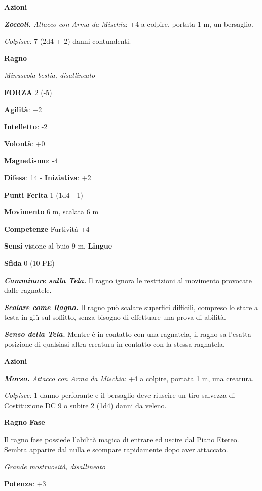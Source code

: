 \begin{multicols}{2}
\smallskip\textbf{Azioni}

\emph{\textbf{Zoccoli.} Attacco con Arma da Mischia}: +4 a colpire,
portata 1 m, un bersaglio.

\emph{Colpisce:} 7 (2d4 + 2) danni contundenti.

\textbf{Ragno}

\emph{Minuscola bestia, disallineato}

\textbf{FORZA} 2 (-5)

\textbf{Agilità}: +2

\textbf{Intelletto}: -2

\textbf{Volontà}: +0

\textbf{Magnetismo}: -4

\textbf{Difesa}: 14 - \textbf{Iniziativa}: +2

\textbf{Punti Ferita} 1 (1d4 - 1)

\textbf{Movimento} 6 m, scalata 6 m

\textbf{Competenze} Furtività +4

\textbf{Sensi} visione al buio 9 m, 
\textbf{Lingue} -

\textbf{Sfida} 0 (10 PE)\smallskip

\emph{\textbf{Camminare sulla Tela.}} Il ragno ignora le restrizioni al
movimento provocate dalle ragnatele.

\emph{\textbf{Scalare come Ragno.}} Il ragno può scalare superfici
difficili, compreso lo stare a testa in giù sul soffitto, senza bisogno
di effettuare una prova di abilità.

\emph{\textbf{Senso della Tela.}} Mentre è in contatto con una
ragnatela, il ragno sa l'esatta posizione di qualsiasi altra creatura in
contatto con la stessa ragnatela.

\smallskip\textbf{Azioni}

\emph{\textbf{Morso.} Attacco con Arma da Mischia}: +4 a colpire,
portata 1 m, una creatura.

\emph{Colpisce:} 1 danno perforante e il bersaglio deve riuscire un tiro
salvezza di Costituzione DC 9 o subire 2 (1d4) danni da veleno.



\textbf{Ragno Fase}

Il ragno fase possiede l'abilità magica di entrare ed uscire dal Piano
Etereo. Sembra apparire dal nulla e scompare rapidamente dopo aver
attaccato.

\emph{Grande mostruosità, disallineato}

\textbf{Potenza}: +3


\end{multicols}
